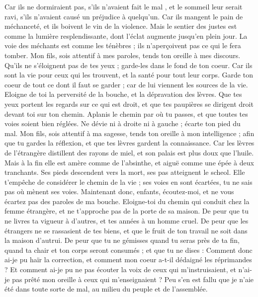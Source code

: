 \begin{multicols}{2}
Car ils ne dormiraient pas, s'ils n'avaient fait le mal , et le sommeil leur serait ravi, s'ils n'avaient causé un préjudice à quelqu'un.
Car ils mangent le pain de méchanceté, et ils boivent le vin de la violence.
Mais le sentier des justes est comme la lumière resplendissante, dont l’éclat augmente jusqu'en plein jour.
La voie des méchants est comme les ténèbres ; ils n’aperçoivent pas ce qui le fera tomber.
Mon fils, sois attentif à mes paroles, tends ton oreille à mes discours.
Qu'ils ne s'éloignent pas de tes yeux ; garde-les dans le fond de ton coeur.
Car ils sont la vie pour ceux qui les trouvent, et la santé pour tout leur corps.
Garde ton coeur de tout ce dont il faut se garder ; car de lui viennent les sources de la vie.
Eloigne de toi la perversité de la bouche, et la dépravation des lèvres.
Que tes yeux portent les regards sur ce qui est droit, et que tes paupières se dirigent droit devant toi sur ton chemin.
Aplanis le chemin par où tu passes, et que toutes tes voies soient bien réglées.
Ne dévie ni à droite ni à gauche ; écarte ton pied du mal.
\VerseOne{}Mon fils, sois attentif à ma sagesse, tends ton oreille à mon intelligence ;
afin que tu gardes la réflexion, et que tes lèvres gardent la connaissance.
Car les lèvres de l'étrangère distillent des rayons de miel, et son palais est plus doux que l'huile.
Mais à la fin elle est amère comme de l'absinthe, et aiguë comme une épée à deux tranchants.
Ses pieds descendent vers la mort, ses pas atteignent le scheol.
Elle t’empêche de considérer le chemin de la vie ; ses voies en sont écartées, tu ne sais pas où mènent ses voies.
Maintenant donc, enfants, écoutez-moi, et ne vous écartez pas des paroles de ma bouche.
Eloigne-toi du chemin qui conduit chez la femme étrangère, et ne t'approche pas de la porte de sa maison.
De peur que tu ne livres ta vigueur à d'autres, et tes années à un homme cruel.
De peur que les étrangers ne se rassasient de tes biens, et que le fruit de ton travail ne soit dans la maison d’autrui.
De peur que tu ne gémisses quand tu seras près de ta fin, quand ta chair et ton corps seront consumés ;
et que tu ne dises : Comment donc ai-je pu haïr la correction, et comment mon coeur a-t-il dédaigné les réprimandes ?
Et comment ai-je pu ne pas écouter la voix de ceux qui m'instruisaient, et n'ai-je pas prêté mon oreille à ceux qui m'enseignaient ?
Peu s'en est fallu que je n'aie été dans toute sorte de mal, au milieu du peuple et de l'assemblée.

\end{multicols}
